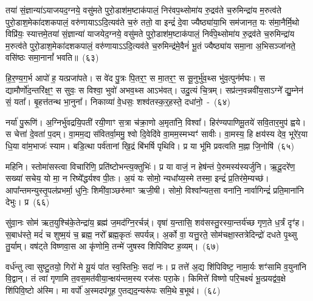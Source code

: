 तया॑ सं॒ज्ञान्या॑\-ऽयाजयद॒ग्नये॒ वसु॑मते पुरो॒डाश॑\-म॒ष्टा\-क॑पालं॒ निर॑वप॒थ्सोमा॑य रु॒द्रव॑ते च॒रुमिन्द्रा॑य म॒रुत्व॑ते पुरो॒डाश॒मेका॑\-दश\-कपालं॒ वरु॑णाया\-ऽऽ\-दि॒त्यव॑ते च॒रुं ततो॒ वा इन्द्रं॑ दे॒वा ज्यैष्ठ्या॑या॒भि सम॑जानत॒ यः स॑मा॒नैर्मि॒थो विप्रि॑यः॒ स्यात्तमे॒तया॑ सं॒ज्ञान्या॑ याजयेद॒ग्नये॒ वसु॑मते पुरो॒डाश॑\-म॒ष्टा\-क॑पालं॒ निर्व॑पे॒थ्सोमा॑य रु॒द्रव॑ते च॒रुमिन्द्रा॑य म॒रुत्व॑ते पुरो॒डाश॒मेका॑\-दश\-कपालं॒ वरु॑णाया\-ऽऽ\-दि॒त्यव॑ते च॒रुमिन्द्र॑मे॒वैनं॑ भू॒तं ज्यैष्ठ्या॑य समा॒ना अ॒भिसञ्जा॑नते॒ वसि॑ष्ठः समा॒नानां᳚ भवति॥~(६३)

{\anuvakamend[{विश॑मे॒व ति॑ष्ठन्त्ये॒तामे॒वाथै॒न्द्रस्य॑ याज्यानुवा॒क्ये॑ तं वरु॑णाय॒ चतु॑र्दश च}]}


हि॒र॒ण्य॒ग॒र्भ आपो॑ ह॒ यत्प्रजा॑पते। स वे॑द पु॒त्रः पि॒तर॒ꣳ॒ स मा॒तर॒ꣳ॒ स सू॒नुर्भु॑व॒थ्स भु॑व॒त्पुन॑र्मघः। स द्यामौर्णो॑द॒न्तरि॑क्ष॒ꣳ॒ स सुवः॒ स विश्वा॒ भुवो॑ अभव॒थ्स आ\-ऽभ॑वत्। उदु॒त्यं चि॒त्रम्। सप्र॑त्न॒वन्नवी॑य॒सा\-ऽग्ने᳚ द्यु॒म्नेन॑ सं॒ यता᳚। बृ॒हत्त॑तन्थ भा॒नुना᳚। निकाव्या॑ वे॒धसः॒ शश्व॑तस्क॒र्॒\mbox{}हस्ते॒ दधा॑नो॒~-~(६४)

नर्या॑ पु॒रूणि॑। अ॒ग्निर्भु॑वद्रयि॒पती॑ रयी॒णाꣳ स॒त्रा च॑क्रा॒णो अ॒मृता॑नि॒ विश्वा᳚। हिर॑ण्यपाणिमू॒तये॑ सवि॒तार॒मुप॑ ह्वये। स चेत्ता॑ दे॒वता॑ प॒दम्। वा॒मम॒द्य स॑वितर्वा॒ममु॒ श्वो दि॒वेदि॑वे वा॒मम॒स्मभ्यꣳ॑ सावीः। वा॒मस्य॒ हि क्षय॑स्य देव॒ भूरे॑र॒या धि॒या वा॑म॒भाजः॑ स्याम। बडि॒त्था पर्व॑तानां खि॒द्रं बि॑भर्\mbox{}षि पृथिवि। प्र या भू॑मि प्रवत्वति म॒ह्ना जि॒नोषि॑~(६५)

महिनि। स्तोमा॑सस्त्वा विचारिणि॒ प्रति॑ष्टोभन्त्य॒क्तुभिः॑। प्र या वाजं॒ न हेष॑न्तं पे॒रुमस्य॑स्यर्जुनि। ऋ॒दू॒दरे॑ण॒ सख्या॑ सचेय॒ यो मा॒ न रिष्ये᳚द्धर्यश्व पी॒तः। अ॒यं यः सोमो॒ न्यधा᳚य्य॒स्मे तस्मा॒ इन्द्रं॑ प्र॒तिर॑मे॒म्यच्छ॑। आपा᳚न्तमन्युस्तृ॒पल॑प्रभर्मा॒ धुनिः॒ शिमी॑वा॒ञ्छरु॑माꣳ ऋजी॒षी। सोमो॒ विश्वा᳚न्यत॒सा वना॑नि॒ नार्वागिन्द्रं॑ प्रति॒माना॑नि देभुः। प्र~(६६)

सु॑वा॒नः सोम॑ ऋत॒युश्चि॑के॒तेन्द्रा॑य॒ ब्रह्म॑ ज॒मद॑ग्नि॒रर्चन्न्॑। वृषा॑ य॒न्तासि॒ शव॑सस्तु॒रस्या॒न्तर्य॑च्छ गृण॒ते ध॒र्त्रं दृꣳ॑ह। स॒बाध॑स्ते॒ मदं॑ च शुष्म॒यं च॒ ब्रह्म॒ नरो᳚ ब्रह्म॒कृतः॑ सपर्यन्न्। अ॒र्को वा॒ यत्तु॒रते॒ सोम॑चक्षा॒स्तत्रेदिन्द्रो॑ दधते पृ॒थ्सु तु॒र्याम्। वष॑ट्ते विष्णवा॒स आ कृ॑णोमि॒ तन्मे॑ जुषस्व शिपिविष्ट ह॒व्यम्।~(६७)

वर्ध॑न्तु त्वा सुष्टु॒तयो॒ गिरो॑ मे यू॒यं पा॑त स्व॒स्तिभिः॒ सदा॑ नः। प्र तत्ते॑ अ॒द्य शि॑पिविष्ट॒ नामा॒र्यः शꣳ॑सामि व॒युना॑नि वि॒द्वान्। तं त्वा॑ गृणामि त॒वस॒मत॑वीया॒न्क्षय॑न्तम॒स्य रज॑सः परा॒के। किमित्ते॑ विष्णो परि॒चक्ष्यं॑ भू॒त्प्रयद्व॑व॒क्षे शि॑पिवि॒ष्टो अ॑स्मि। मा वर्पो॑ अ॒स्मदप॑गूह ए॒तद्यद॒न्यरू॑पः समि॒थे ब॒भूथ॑।~(६८)

